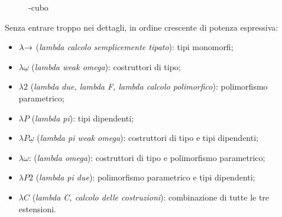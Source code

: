 \begin{figure}[H]
    \centering
    \usetikzlibrary{3d}
    \usetikzlibrary{arrows.meta}
    \vspace{4mm}
    \caption{\textlambda-cubo}
    \label{fig:3-lambda-cube}
    \vspace{4mm}
\end{figure}

\noindent Senza entrare troppo nei dettagli, in ordine crescente di potenza espressiva:

\begin{itemize}
    \item \textbf{$\lambda\mkern-4mu\rightarrow$} (\textit{lambda calcolo semplicemente tipato}): tipi monomorfi;
    \item \textbf{$\lambda\underline{\omega}$} (\textit{lambda weak omega}): costruttori di tipo;
    \item \textbf{$\lambda2$} (\textit{lambda due, lambda F, lambda calcolo polimorfico}): polimorfismo parametrico;
    \item \textbf{$\lambda P$} (\textit{lambda pi}): tipi dipendenti;
    \item \textbf{$\lambda P\underline{\omega}$} (\textit{lambda pi weak omega}): costruttori di tipo e tipi dipendenti;
    \item \textbf{$\lambda\omega$}: (\textit{lambda omega}): costruttori di tipo e polimorfismo parametrico;
    \item \textbf{$\lambda P2$} (\textit{lambda pi due}): polimorfismo parametrico e tipi dipendenti;
    \item \textbf{$\lambda C$} (\textit{lambda C, calcolo delle costruzioni}): combinazione di tutte le tre estensioni.
\end{itemize}